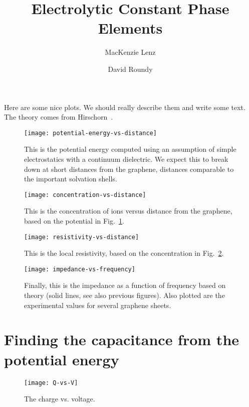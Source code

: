 \documentclass[twocolumn]{revtex4-1}
\begin{document}
\title{Electrolytic Constant Phase Elements}
\author{MacKenzie Lenz}
\author{David Roundy}


\maketitle

Here are some nice plots.  We should really describe them and write
some text.  The theory comes from
Hirschorn~\cite{hirschorn2010constant}.

\begin{figure}
  \texttt{[image: potential-energy-vs-distance]}
  \caption{This is the potential energy computed using an assumption
    of simple electrostatics with a continuum dielectric.  We expect
    this to break down at short distances from the graphene, distances
    comparable to the important solvation shells.}
  \label{fig:pot}
\end{figure}

\begin{figure}
  \texttt{[image: concentration-vs-distance]}
  \caption{This is the concentration of ions versus distance from the
    graphene, based on the potential in Fig.~\ref{fig:pot}.}
  \label{fig:concentration}
\end{figure}

\begin{figure}
  \texttt{[image: resistivity-vs-distance]}
  \caption{This is the local resistivity, based on the concentration
    in Fig.~\ref{fig:concentration}.}
\end{figure}

\begin{figure}
  \texttt{[image: impedance-vs-frequency]}
  \caption{Finally, this is the impedance as a function of frequency
    based on theory (solid lines, see also previous figures).  Also
    plotted are the experimental values for several graphene sheets.}
\end{figure}

\afterpage{\clearpage}

\clearpage

\section{Finding the capacitance from the potential energy}

\begin{figure}
  \texttt{[image: Q-vs-V]}
  \caption{The charge vs. voltage.}\label{fig:Q-vs-V}
\end{figure}
\end{document}
